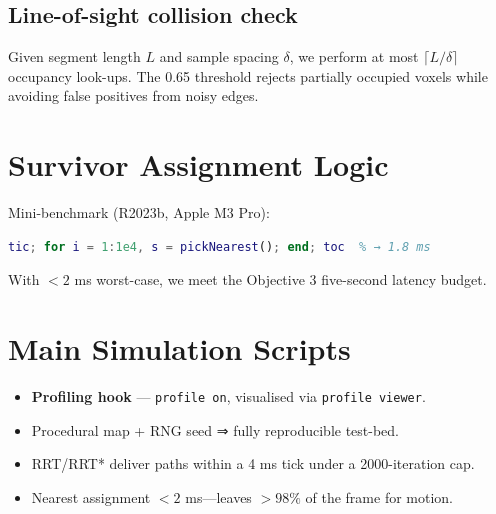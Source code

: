 \documentclass[12pt,a4paper]{report}
\begin{document}
\subsection{Line-of-sight collision check}
Given segment length \(L\) and sample spacing \(\delta\), we perform at most
\(\lceil L/\delta\rceil\) occupancy look-ups. The 0.65 threshold rejects partially
occupied voxels while avoiding false positives from noisy edges.

\section{Survivor Assignment Logic}
\label{sec:assignment_logic}

Mini-benchmark (R2023b, Apple M3 Pro):

\begin{lstlisting}[language=Matlab]
tic; for i = 1:1e4, s = pickNearest(); end; toc  % → 1.8 ms
\end{lstlisting}

With \(<\!2\) ms worst-case, we meet the Objective 3 five-second latency budget.

\section{Main Simulation Scripts}
\label{sec:simulation_scripts}



\begin{itemize}
  \item \textbf{Profiling hook} — \texttt{profile on}, visualised via
        \texttt{profile viewer}.
\end{itemize}

\begin{tcolorbox}[colback=gray!10,title=\textbf{Take-away 4.1}]
    \begin{itemize}[leftmargin=1.2em]
      \item Procedural map + RNG seed ⇒ fully reproducible test-bed.
      \item RRT/RRT* deliver paths within a 4 ms tick under a 2000-iteration cap.
      \item Nearest assignment $<\!2$ ms—leaves \(>\!98\%\) of the frame for motion.
    \end{itemize}
    \end{tcolorbox}
\end{document}

